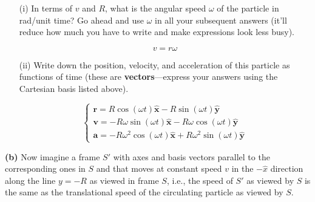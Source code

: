 \documentclass[12pt]{article}
\newcommand{\unx}{\hat{\mathbf{x}}}
\newcommand{\uny}{\hat{\mathbf{y}}}
\begin{document}
\begin{enumerate}
    \item[(i)] In terms of \(v\) and \(R\), what is the angular speed \(\omega\) of the particle in rad/unit time? Go ahead and use \(\omega\) in all your subsequent answers (it’ll reduce how much you have to write and make expressions look less busy).

    \[
    v = r\omega
    \]

    
    \item[(ii)] Write down the position, velocity, and acceleration of this particle as functions of time (these are \textbf{vectors}—express your answers using the Cartesian basis listed above).

    \[
    \begin{cases}
        \mathbf{r} = R\cos(\omega t) \unx - R\sin(\omega t)\uny\\
        \mathbf{v} = -R\omega\sin(\omega t)\unx  - R\omega\cos(\omega t)\uny\\
        \mathbf{a} = -R\omega^2\cos(\omega t) \unx + R\omega^2\sin(\omega t)\uny
    \end{cases}
    \]


    
\end{enumerate}

\textbf{(b)} Now imagine a frame \(S'\) with axes and basis vectors parallel to the corresponding ones in \(S\) and that moves at constant speed \(v\) in the \(-\hat{x}\) direction along the line \(y = -R\) as viewed in frame \(S\), i.e., the speed of \(S'\) as viewed by \(S\) is the same as the translational speed of the circulating particle as viewed by \(S\).
\end{document}
